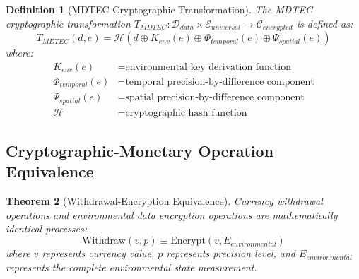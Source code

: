 \documentclass[12pt,a4paper]{article}
\newtheorem{theorem}{Theorem}
\newtheorem{definition}[theorem]{Definition}
\begin{document}
\begin{definition}[MDTEC Cryptographic Transformation]
The MDTEC cryptographic transformation $T_{MDTEC}: \mathcal{D}_{data} \times \mathcal{E}_{universal} \to \mathcal{C}_{encrypted}$ is defined as:
\begin{equation}
T_{MDTEC}(d, e) = \mathcal{H}(d \oplus K_{env}(e) \oplus \Phi_{temporal}(e) \oplus \Psi_{spatial}(e))
\end{equation}
where:
\begin{align}
K_{env}(e) &= \text{environmental key derivation function} \\
\Phi_{temporal}(e) &= \text{temporal precision-by-difference component} \\
\Psi_{spatial}(e) &= \text{spatial precision-by-difference component} \\
\mathcal{H} &= \text{cryptographic hash function}
\end{align}
\end{definition}

\subsection{Cryptographic-Monetary Operation Equivalence}

\begin{theorem}[Withdrawal-Encryption Equivalence]
Currency withdrawal operations and environmental data encryption operations are mathematically identical processes:
\begin{equation}
\text{Withdraw}(v, p) \equiv \text{Encrypt}(v, E_{environmental})
\end{equation}
where $v$ represents currency value, $p$ represents precision level, and $E_{environmental}$ represents the complete environmental state measurement.
\end{theorem}
\end{document}
